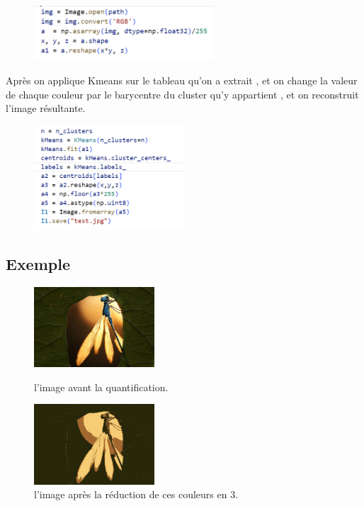 \documentclass[a4paper,12pt]{report}
\begin{document}
\begin{figure}[ht]
    \includegraphics[width=0.6\textwidth]{pycode.PNG}
    \label{fig:open}
\end{figure}
 
 Après on applique Kmeans sur le tableau qu'on a extrait , et on change la valeur de chaque couleur par le barycentre du cluster qu'y appartient , et on reconstruit l'image résultante.

\begin{figure}[h]
    \includegraphics[width=0.5\textwidth]{pycode2.PNG}
    \label{fig:my_label}
\end{figure}

\subsection*{Exemple }
\begin{figure}[!h]
    \centering
    \includegraphics[width=0.4\textwidth]{insect.jpg}
    \caption{l'image avant la quantification.}
    \includegraphics[width=0.4\textwidth]{test.jpg}
    \caption{l'image après la réduction de ces couleurs en 3.}
    \label{fig:my_label}
\end{figure}
\newpage
\end{document}
